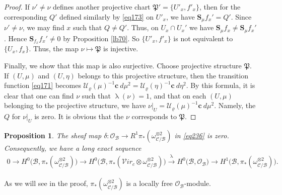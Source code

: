 \documentclass[12pt,a4paper,notitlepage]{report}
\theoremstyle{definition}
\theoremstyle{plain}
\newtheorem{pp}[df]{Proposition}
\newcommand{\fk}{\mathfrak}
\newcommand{\mc}{\mathcal}
\newcommand{\scr}{\mathscr}
\newcommand{\cbf}{\mathbf c}
\newcommand{\svir}{\mathcal V\!\mathit{ir}}
\newcommand{\Sbf}{\mathbf{S}}
\numberwithin{equation}{section}
\begin{document}
\begin{proof}
If $\nu'\neq \nu$ defines another projective chart $\fk P'=\{U'_x,f'_x\}$, then for the corresponding $Q'$ defined similarly by \eqref{eq173} on $U'_x$, we have $\Sbf_\mu f_x'=Q'$. Since $\nu'\neq \nu$, we may find $x$ such that $Q\neq Q'$. Thus, on $U_x\cap U_x'$ we have $\Sbf_\mu f_x\neq \Sbf_\mu f_x'$. Hence $\Sbf_{f_x} f_x'\neq 0$ by Proposition \ref{lb70}. So $\{U'_x,f'_x\}$ is not equivalent to $\{U_x,f_x\}$. Thus, the map $\nu\mapsto\fk P$ is injective. 

Finally, we show that this map is also surjective. Choose projective structure  $\fk P$. If $(U,\mu)$ and $(U,\eta)$ belongs to this projective structure, then the transition function \eqref{eq171} becomes $\mc U_\varrho(\mu)^{-1}\cbf~d\mu^2=\mc U_\varrho(\eta)^{-1}\cbf~d\eta^2$. By this formula, it is clear that one can find $\nu$ such that $\uplambda(\nu)=1$, and that on each $(U,\mu)$ belonging to the projective structure, we have $\nu|_U=\mc U_\varrho(\mu)^{-1}\cbf ~d\mu^2$. Namely, the $Q$ for $\nu|_U$ is zero. It is obvious that the $\nu$ corresponds to $\fk P$.
\end{proof}


\begin{pp}
The sheaf map $\delta:\scr O_{\mc B}\rightarrow R^1\pi_*(\omega_{\mc C/\mc B}^{\otimes 2})$ in \eqref{eq236} is zero. Consequently, we have a long exact sequence
\begin{align}
0\rightarrow H^0\big(\mc B,\pi_*(\omega_{\mc C/\mc B}^{\otimes 2})\big)\rightarrow H^0\big(\mc B,\pi_*(\svir_c\otimes \omega_{\mc C/\mc B}^{\otimes 2})\big)\xrightarrow{\uplambda} H^0\big(\mc B,\scr O_{\mc B}\big)\rightarrow H^1\big(\mc B,\pi_*(\omega_{\mc C/\mc B}^{\otimes 2})\big).\label{eq175}
\end{align}
\end{pp}

As we will see in the proof, $\pi_*(\omega_{\mc C/\mc B}^{\otimes 2})$ is a locally free $\scr O_{\mc B}$-module.
\end{document}
